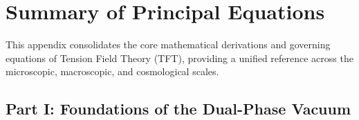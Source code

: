 \chapter*{Summary of Principal Equations}
\label{app:master_equations}

This appendix consolidates the core mathematical derivations and governing equations of Tension Field Theory (TFT), providing a unified reference across the microscopic, macroscopic, and cosmological scales.

\section*{Part I: Foundations of the Dual-Phase Vacuum}

\vspace{0.5cm}
\noindent
\renewcommand{\arraystretch}{1.6} 
